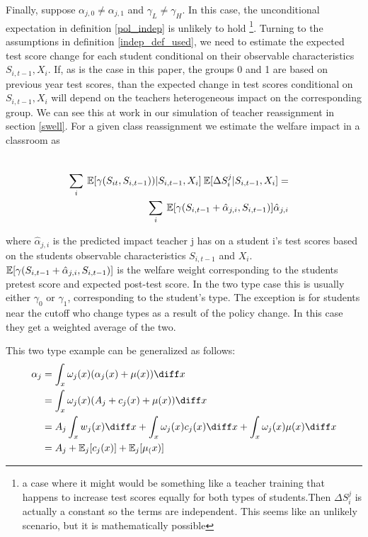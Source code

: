 \documentclass{article}
\theoremstyle{definition}
\theoremstyle{definition}
\theoremstyle{definition}
\theoremstyle{definition}
\begin{document}
    Finally, suppose $\alpha_{j,0} \neq \alpha_{j,1}$ and $\gamma_L \neq \gamma_H$. In this case, the unconditional expectation in definition \ref{pol_indep} is unlikely to hold \footnote{a case where it might would be something like a teacher training that happens to increase test scores equally for both types of students.Then $\Delta S_i^j$ is actually a constant so the terms are independent. This seems like an unlikely scenario, but it is mathematically possible}. Turning to the assumptions in definition \ref{indep_def_used}, we need to estimate the expected test score change for each student conditional on their observable characteristics $S_{i,t-1}, X_i$. If, as is the case in this paper, the groups 0 and 1 are based on previous year test scores, than the expected change in test scores conditional on $S_{i,t-1}, X_i$ will depend on the teachers heterogeneous impact on the corresponding group. We can see this at work in our simulation of teacher reassignment in section \ref{swell}. For a given class reassignment we estimate the welfare impact in a classroom as 
    
    \begin{align}
      \\ \sum_i \: \mathbb{E}[\gamma(S_{it}, S_{i,t-1}))|S_{i,t-1},  X_i] \:\mathbb{E}[\Delta S_i^j|S_{i,t-1},  X_i]  = &
      \\ \sum_i \: \mathbb{E}[\gamma(S_{i,t-1} + \hat{\alpha}_{j,i}, S_{i,t-1})] \hat{\alpha}_{j,i}
    \end{align}

    where $\hat{\alpha}_{j,i}$ is the predicted impact teacher j has on a student i's test scores based on the students observable characteristics $S_{i,t-1}$ and  $ X_i$. $\mathbb{E}[\gamma(S_{i,t-1} + \hat{\alpha}_{j,i}, S_{i,t-1})]$ is the welfare weight corresponding to the students pretest score and expected post-test score. In the two type case this is usually either $\gamma_0$ or $\gamma_1$, corresponding to the student's type. The exception is for students near the cutoff who change types as a result of the policy change. In this case they get a weighted average of the two. 
    
    This two type example can be generalized as follows: 
    \begin{align*}
        \alpha_j  &= \int_x \omega_j(x)(\alpha_j(x) + \mu(x)) \diff x \\
                  &= \int_x \omega_j(x)(A_j + c_j(x) + \mu(x)) \diff x \\
                  &= A_j \int_x w_j(x) \diff x + \int_x \omega_j(x) c_j(x)\diff x + \int_x \omega_j(x) \mu(x)\diff x \\
                  &= A_j  + \mathbb{E}_j[c_j(x)] + \mathbb{E}_j[\mu_(x)]
    \end{align*}
    
\end{document}
